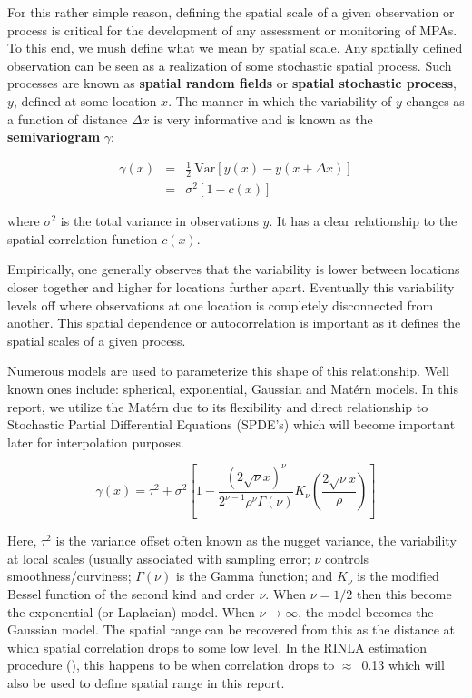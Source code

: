 \documentclass[letterpaper,portrait,11pt]{scrartcl}
\numberwithin{equation}{section}		%
\numberwithin{figure}{section}			%
\numberwithin{table}{section}				%
\begin{document}
For this rather simple reason, defining the spatial scale of a given observation or process is critical for the development of any assessment or monitoring of MPAs. To this end, we mush define what we mean by spatial scale. Any spatially defined observation can be seen as a realization of some stochastic spatial process. Such  processes are known as \textbf{spatial random fields} or \textbf{spatial stochastic process}, $y$, defined at some location $x$. The manner in which the variability of $y$ changes as a function of distance $\Delta x$ is very informative and is known as the \textbf{semivariogram} $\gamma$:

\begin{eqnarray*}
\label{eq:semivariogram}
\gamma(x) &=& \frac{1}{2} \ \textrm{Var} [ y(x) - y(x + \Delta x)]  \\
&=& \sigma^2 [1-c(x)] 
\end{eqnarray*}

where $\sigma^2$ is the total variance in observations $y$. It has a clear relationship to the spatial correlation function $c(x)$. 

Empirically, one generally observes that the variability is lower between locations closer together and higher for locations further apart. Eventually this variability levels off where observations at one location is completely disconnected from another. This spatial dependence or autocorrelation is important as it defines the spatial scales of a given process. 

Numerous models are used to parameterize this shape of this relationship. Well known ones include: spherical, exponential, Gaussian and Mat\'{e}rn models. In this report, we utilize the Mat\'{e}rn due to its flexibility and direct relationship to Stochastic Partial Differential Equations (SPDE's) which will become important later for interpolation purposes. 

\begin{equation}
\gamma(x) = \tau^2 + \sigma^2 [ 1 - \frac{{(2\sqrt{\nu}x)}^\nu}{2^{\nu-1} \rho^{\nu} \Gamma(\nu)}
 K_\nu(\frac{2\sqrt{\nu}x}{\rho} ) ]
\end{equation}

Here, $\tau^2$ is the variance offset often known as the nugget variance, the variability at local scales (usually associated with sampling error; $\nu$ controls smoothness/curviness; $\Gamma(\nu)$ is the Gamma function; and $K_{\nu}$ is the modified Bessel function of the second kind and order $\nu$. When $\nu=1/2$ then this become the exponential (or Laplacian) model. When $\nu \longrightarrow \infty$, the model becomes the Gaussian model. The spatial range can be recovered from this as the distance at which spatial correlation drops to some low level. In the RINLA estimation procedure (\cite{rinla}), this happens to be when correlation drops to $\approx$~0.13 which will also be used to define spatial range in this report. 
\end{document}
